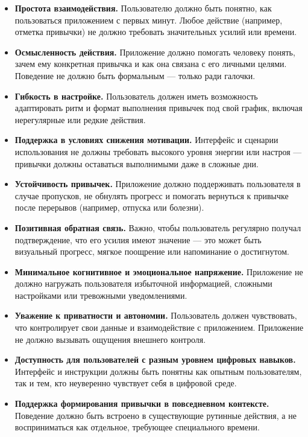 \documentclass[pdflatex,sn-mathphys-num]{sn-jnl}%
\theoremstyle{thmstyleone}%
\theoremstyle{thmstyletwo}%
\theoremstyle{thmstylethree}%
\begin{document}
\begin{itemize}
    \item \textbf{Простота взаимодействия.} Пользователю должно быть понятно, как пользоваться приложением с первых минут. Любое действие (например, отметка привычки) не должно требовать значительных усилий или времени.

    \item \textbf{Осмысленность действия.} Приложение должно помогать человеку понять, зачем ему конкретная привычка и как она связана с его личными целями. Поведение не должно быть формальным — только ради галочки.

    \item \textbf{Гибкость в настройке.} Пользователь должен иметь возможность адаптировать ритм и формат выполнения привычек под свой график, включая нерегулярные или редкие действия.

    \item \textbf{Поддержка в условиях снижения мотивации.} Интерфейс и сценарии использования не должны требовать высокого уровня энергии или настроя — привычки должны оставаться выполнимыми даже в сложные дни.

    \item \textbf{Устойчивость привычек.} Приложение должно поддерживать пользователя в случае пропусков, не обнулять прогресс и помогать вернуться к привычке после перерывов (например, отпуска или болезни).

    \item \textbf{Позитивная обратная связь.} Важно, чтобы пользователь регулярно получал подтверждение, что его усилия имеют значение — это может быть визуальный прогресс, мягкое поощрение или напоминание о достигнутом.

    \item \textbf{Минимальное когнитивное и эмоциональное напряжение.} Приложение не должно нагружать пользователя избыточной информацией, сложными настройками или тревожными уведомлениями.

    \item \textbf{Уважение к приватности и автономии.} Пользователь должен чувствовать, что контролирует свои данные и взаимодействие с приложением. Приложение не должно вызывать ощущения внешнего контроля.

    \item \textbf{Доступность для пользователей с разным уровнем цифровых навыков.} Интерфейс и инструкции должны быть понятны как опытным пользователям, так и тем, кто неуверенно чувствует себя в цифровой среде.

    \item \textbf{Поддержка формирования привычки в повседневном контексте.} Поведение должно быть встроено в существующие рутинные действия, а не восприниматься как отдельное, требующее специального времени.

\end{itemize}
\end{document}
